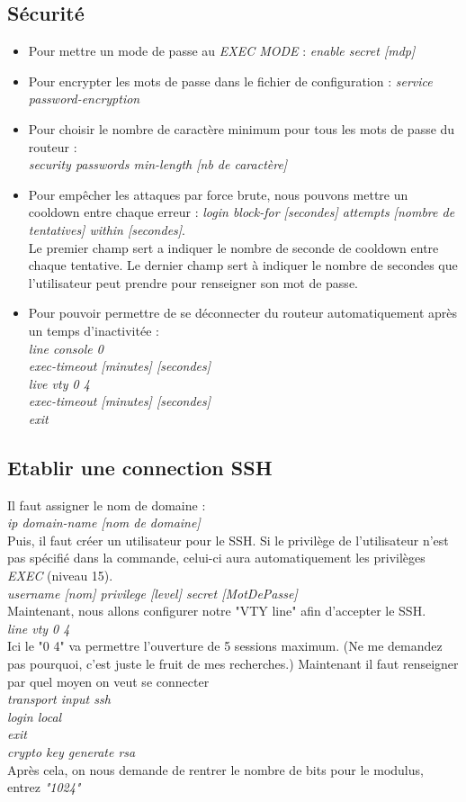 \documentclass[a4paper]{article}
\begin{document}
\subsection{Sécurité}
\begin{itemize}
  \item Pour mettre un mode de passe au \emph{EXEC MODE} : \emph{enable secret [mdp]}
  \item Pour encrypter les mots de passe dans le fichier de configuration : \emph{service password-encryption}
  \item Pour choisir le nombre de caractère minimum pour tous les mots de passe du routeur : \\\emph{security passwords min-length [nb de caractère]}
  \item Pour empêcher les attaques par force brute, nous pouvons mettre un cooldown entre chaque erreur : \emph{login block-for [secondes] attempts [nombre de tentatives] within [secondes]}.\\
  Le premier champ sert a indiquer le nombre de seconde de cooldown entre chaque tentative. Le dernier champ sert à indiquer le nombre de secondes que l'utilisateur peut prendre pour renseigner son mot de passe.
  \item Pour pouvoir permettre de se déconnecter du routeur automatiquement après un temps d'inactivitée :\\
  \emph{line console 0}\\
  \emph{exec-timeout [minutes] [secondes]}\\
  \emph{live vty 0 4}\\
  \emph{exec-timeout [minutes] [secondes]}\\
  \emph{exit}
\end{itemize}

\subsection{Etablir une connection SSH}
Il faut assigner le nom de domaine : \\
\emph{ip domain-name [nom de domaine]}\\
Puis, il faut créer un utilisateur pour le SSH. Si le privilège de l'utilisateur n'est pas spécifié dans la commande,
celui-ci aura automatiquement les privilèges \emph{EXEC} (niveau 15).\\
\emph{username [nom] privilege [level] secret [MotDePasse]}\\
Maintenant, nous allons configurer notre "VTY line" afin d'accepter le SSH.\\
\emph{line vty 0 4}\\
Ici le "0 4" va permettre l'ouverture de 5 sessions maximum. (Ne me demandez pas pourquoi, c'est juste le fruit de mes recherches.)
Maintenant il faut renseigner par quel moyen on veut se connecter\\
\emph{transport input ssh}\\
\emph{login local}\\
\emph{exit}\\
\emph{crypto key generate rsa}\\
Après cela, on nous demande de rentrer le nombre de bits pour le modulus, entrez \emph{"1024"}\\
\end{document}
